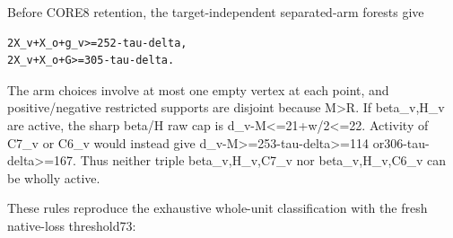 \documentclass[10pt,a4paper]{article}
\theoremstyle{definition}
\begin{document}
Before CORE8 retention,\allowbreak{} the target-independent separated-arm forests
give

\begin{lstlisting}
2X_v+X_o+g_v>=252-tau-delta,
2X_v+X_o+G>=305-tau-delta.
\end{lstlisting}

The arm choices involve at most one empty vertex at each point,\allowbreak{} and
positive/negative restricted supports are disjoint because
M\textgreater R. If beta\_\allowbreak{}v,\allowbreak{}H\_\allowbreak{}v are active,\allowbreak{} the sharp beta/H raw cap is
d\_\allowbreak{}v-M\textless=\allowbreak{}21+\allowbreak{}w/2\textless=\allowbreak{}22. Activity of C7\_\allowbreak{}v or C6\_\allowbreak{}v would
instead give d\_\allowbreak{}v-M\textgreater=\allowbreak{}253-tau-delta\textgreater=\allowbreak{}114
or306-tau-delta\textgreater=\allowbreak{}167. Thus neither triple beta\_\allowbreak{}v,\allowbreak{}H\_\allowbreak{}v,\allowbreak{}C7\_\allowbreak{}v
nor beta\_\allowbreak{}v,\allowbreak{}H\_\allowbreak{}v,\allowbreak{}C6\_\allowbreak{}v can be wholly active.

These rules reproduce the exhaustive whole-unit classification with the
fresh native-loss threshold73:
\end{document}
